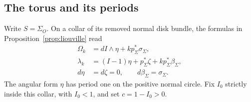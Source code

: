 \documentclass[11pt]{amsart}
\theoremstyle{definition}
\theoremstyle{remark}
\begin{document}
\subsection{The torus and its periods}

Write $S=\Sigma_O$. On a collar of its removed normal disk bundle,
the formulas in Proposition~\ref{prop:liouville} read
\begin{equation}\label{eq:torus-collar}
\begin{aligned}
 \Omega_k&=dI\wedge\eta+k p_\Sigma^*\sigma_\Sigma,\\
 \lambda_k&=(I-1)\eta+p_\Sigma^*\zeta
                         +k p_\Sigma^*\beta_\Sigma,\\
 d\eta&=d\zeta=0,\qquad d\beta_\Sigma=\sigma_\Sigma.
\end{aligned}
\end{equation}
The angular form $\eta$ has period one on the positive normal circle.
Fix $I_0$ strictly inside this collar, with $I_0<1$, and set
$c=1-I_0>0$.
\end{document}
